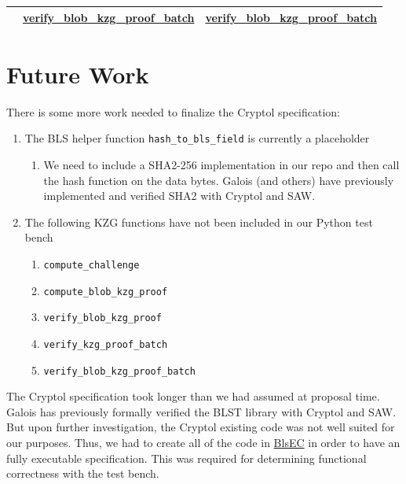\documentclass[12pt]{galois-whitepaper}
\begin{document}
\begin{table}
\begin{center}
\begin{tabular}{ |c|c|c| }
            & \href{https://github.com/ethereum/consensus-specs/blob/68d32accf945a84f69d4c779cb6c71223a311eac/specs/deneb/polynomial-commitments.md\#verify_blob_kzg_proof_batch}{verify\_blob\_kzg\_proof\_batch}
            & \href{https://github.com/GaloisInc/ckzg-eip-4844-verification/blob/be7f8802aac340da5b4db3ca5709fd74516ec24b/spec/Spec/KZG.cry\#L155}{verify\_blob\_kzg\_proof\_batch}\\
        \hline
    \end{tabular}
\end{center}
\end{table}


\clearpage

\section{Future Work}

There is some more work needed to finalize the Cryptol specification:
\begin{enumerate}
    \item The BLS helper function \texttt{hash\_to\_bls\_field} is currently a placeholder
          \begin{enumerate}
                \item We need to include a SHA2-256 implementation in our repo and then call the hash function on the data bytes.
                      Galois (and others) have previously implemented and verified SHA2 with Cryptol and SAW.
          \end{enumerate}
    \item The following KZG functions have not been included in our Python test bench
          \begin{enumerate}
                \item \texttt{compute\_challenge}
                \item \texttt{compute\_blob\_kzg\_proof}
                \item \texttt{verify\_blob\_kzg\_proof}
                \item \texttt{verify\_kzg\_proof\_batch}
                \item \texttt{verify\_blob\_kzg\_proof\_batch}
          \end{enumerate}
\end{enumerate}

The Cryptol specification took longer than we had assumed at proposal time.
Galois has previously formally verified the BLST library with Cryptol and SAW.
But upon further investigation, the Cryptol existing code was not well suited for
our purposes. Thus, we had to create all of the code in
\href{https://github.com/GaloisInc/ckzg-eip-4844-verification/tree/main/spec/Spec/BlsEC}{BlsEC}
in order to have an fully executable specification. This was required for determining
functional correctness with the test bench.
\end{document}
